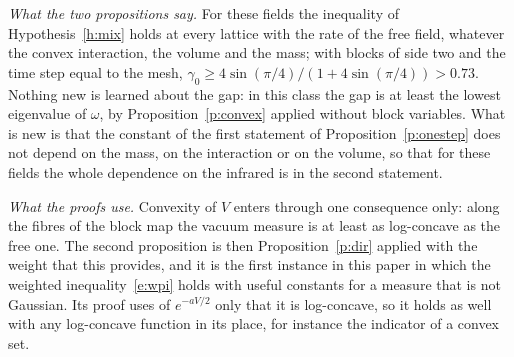 \emph{What the two propositions say.} For these fields the inequality of Hypothesis~\ref{h:mix} holds at
every lattice with the rate of the free field, whatever the convex interaction, the volume and the mass;
with blocks of side two and the time step equal to the mesh,
$\gamma_0\ge4\sin(\pi/4)/(1+4\sin(\pi/4))>0.73$. Nothing new is learned about the gap: in this class the gap
is at least the lowest eigenvalue of $\omega$, by Proposition~\ref{p:convex} applied without block
variables. What is new is that the constant of the first statement of Proposition~\ref{p:onestep} does not
depend on the mass, on the interaction or on the volume, so that for these fields the whole dependence on
the infrared is in the second statement.

\emph{What the proofs use.} Convexity of $V$ enters through one consequence only: along the fibres of the
block map the vacuum measure is at least as log-concave as the free one. The second proposition is then
Proposition~\ref{p:dir} applied with the weight that this provides, and it is the first instance in this
paper in which the weighted inequality~\eqref{e:wpi} holds with useful constants for a measure that is not
Gaussian. Its proof uses of $e^{-aV/2}$ only that it is log-concave, so it holds as well with any
log-concave function in its place, for instance the indicator of a convex set.

